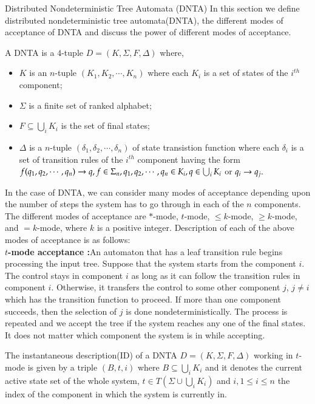 {Distributed Nondeterministic Tree Automata (DNTA)}
In this section we define distributed nondeterministic tree automata(DNTA), the 
different modes of acceptance of DNTA and discuss the power of different modes
of acceptance.
\begin{definition}
A DNTA is a $4$-tuple $D=(K,\Sigma,F,\Delta)$ where,
\begin{itemize}%
\item
$K$ is an $n$-tuple $(K_1,K_2,\cdots,K_n) $ where each $K_i$ is a set of states of
the $i^{th}$ component;
\item
$\Sigma$ is a finite set of ranked alphabet;
\item
$F \subseteq \bigcup_i K_i$ is the set of final states;
\item
$\Delta$ is a $n$-tuple $(\delta_1,\delta_2,\cdots,\delta_n) $ of state transistion
function where each $\delta_i$ is a set of transition rules of the $i^{th}$ component
having the form $f(q_1,q_2,\cdots,q_n)\rightarrow q, f \in \Sigma_n,q_1,q_2,\cdots,q_n \in K_i,
 q \in \bigcup_i K_i $ or $q_i \rightarrow q_j.$
\end{itemize}
\end{definition}
In the case of DNTA, we can consider many modes of acceptance depending upon the
number of steps the system has to go through in each of the $n$ components.
The different modes of acceptance are $*$-mode, $t$-mode, 
$\le k$-mode, $\ge k$-mode, and $=k$-mode, where $k$ is a positive integer.
Description of each of the above modes of acceptance is as follows:\\
\noindent
\textbf{$t$-mode acceptance :}An automaton that has a leaf transition rule begins
processing the input tree. Suppose that the system starts from the component $i$. 
The control stays in component $i$ as long as it can follow the transition rules
in component $i$. Otherwise, it transfers the control to some other component $j$, $j\ne i$  
which has the transition function to proceed. If more than one component succeeds,
then the selection of $j$ is done nondeterministically. The process is repeated
and we accept the tree if the system reaches any one of the final states. It does
not matter which component the system is in while accepting.
\begin{definition}
The instantaneous description(ID) of a DNTA $D=(K,\Sigma,F,\Delta)$ 
 working in $t$-mode is given by a triple $(B,t,i)$ 
where $B \subseteq \bigcup_i K_i $ and it  denotes the current active state 
set of the whole system, 
$t \in T(\Sigma \cup  \bigcup_i K_i)$ and $i,1\le i \le n$ the index of 
the component in which the system is currently in.
\end{definition}
